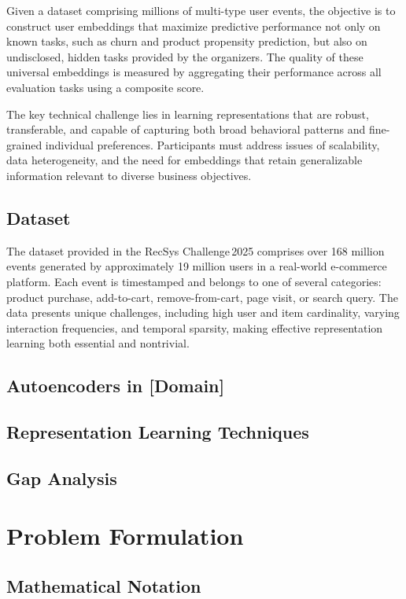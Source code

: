 \documentclass[sigconf]{acmart}
\begin{document}
Given a dataset comprising millions of multi-type user events, the objective is to construct user embeddings that maximize predictive performance not only on known tasks, such as churn and product propensity prediction, but also on undisclosed, hidden tasks provided by the organizers. The quality of these universal embeddings is measured by aggregating their performance across all evaluation tasks using a composite score.

The key technical challenge lies in learning representations that are robust, transferable, and capable of capturing both broad behavioral patterns and fine-grained individual preferences. Participants must address issues of scalability, data heterogeneity, and the need for embeddings that retain generalizable information relevant to diverse business objectives.
\subsection{Dataset}
The dataset provided in the RecSys Challenge 2025 comprises over 168 million events generated by approximately 19 million users in a real-world e-commerce platform. Each event is timestamped and belongs to one of several categories: product purchase, add-to-cart, remove-from-cart, page visit, or search query. The data presents unique challenges, including high user and item cardinality, varying interaction frequencies, and temporal sparsity, making effective representation learning both essential and nontrivial.



\label{sec:related}
\subsection{Autoencoders in [Domain]}
\subsection{Representation Learning Techniques}
\subsection{Gap Analysis}

\section{Problem Formulation}
\subsection{Mathematical Notation}
\end{document}

